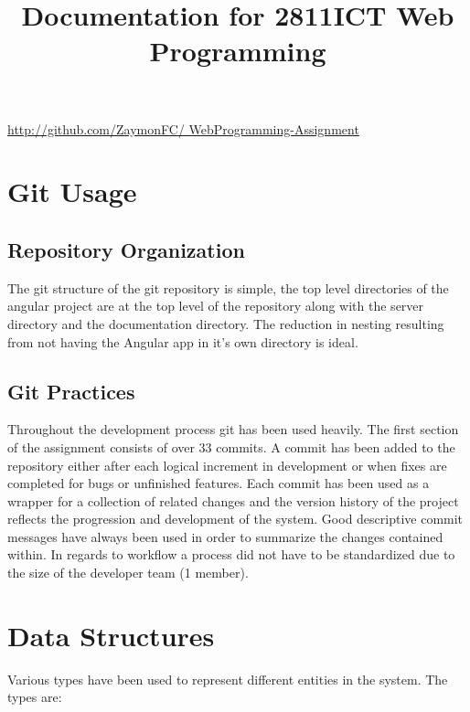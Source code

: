 \documentclass[11pt, conference,letterpaper]{IEEEtran}
\begin{document}
\title{Documentation for 2811ICT Web Programming}
\author{
}

\maketitle


%
%   

\url{http://github.com/ZaymonFC/
WebProgramming-Assignment}

\section{Git Usage}
\subsection{Repository Organization}
\par The git structure of the git repository is simple, the top level directories of the angular project are at the top level of the repository along with the server directory and the documentation directory. The reduction in nesting resulting from not having the Angular app in it's own directory is ideal.
\subsection{Git Practices}
Throughout the development process git has been used heavily. The first section of the assignment consists of over 33 commits. A commit has been added to the repository either after each logical increment in development or when fixes are completed for bugs or unfinished features. Each commit has been used as a wrapper for a collection of related changes and the version history of the project reflects the progression and development of the system. Good descriptive commit messages have always been used in order to summarize the changes contained within. In regards to workflow a process did not have to be standardized due to the size of the developer team (1 member).

\section{Data Structures}
\par Various types have been used to represent different entities in the system. The types are:
\end{document}

